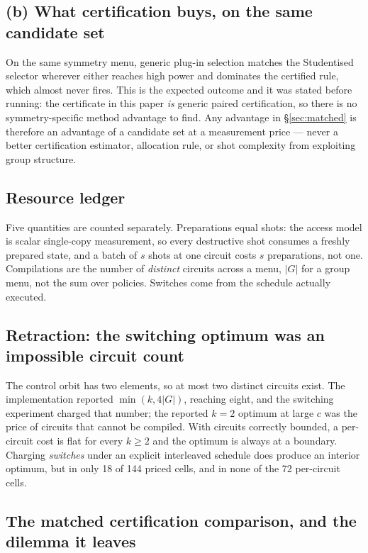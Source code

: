 \documentclass{article}
\begin{document}
\subsection{(b) What certification buys, on the same candidate set}
\label{sec:plugin}
On the same symmetry menu, generic plug-in selection matches the Studentised selector wherever either
reaches high power and dominates the certified rule, which almost never fires. This is the expected
outcome and it was stated before running: the certificate in this paper \emph{is} generic paired
certification, so there is no symmetry-specific method advantage to find. Any advantage in
\S\ref{sec:matched} is therefore an advantage of a candidate set at a measurement price --- never a
better certification estimator, allocation rule, or shot complexity from exploiting group structure.

\subsection{Resource ledger}
\label{sec:ledger}
Five quantities are counted separately. Preparations equal shots: the access model is scalar single-copy
measurement, so every destructive shot consumes a freshly prepared state, and a batch of $s$ shots at one
circuit costs $s$ preparations, not one. Compilations are the number of \emph{distinct} circuits across a
menu, $|G|$ for a group menu, not the sum over policies. Switches come from the schedule actually
executed.



\subsection{Retraction: the switching optimum was an impossible circuit count}
\label{sec:switchretract}
The control orbit has two elements, so at most two distinct circuits exist. The implementation reported
$\min(k,4|G|)$, reaching eight, and the switching experiment charged that number; the reported $k=2$
optimum at large $c$ was the price of circuits that cannot be compiled. With circuits correctly
bounded, a per-circuit cost is flat for every $k\ge2$ and the optimum is always at a boundary. Charging
\emph{switches} under an explicit interleaved schedule does produce an interior optimum, but in only 18
of 144 priced cells, and in none of the 72 per-circuit cells.



\subsection{The matched certification comparison, and the dilemma it leaves}
\label{sec:certdilemma}
\end{document}
